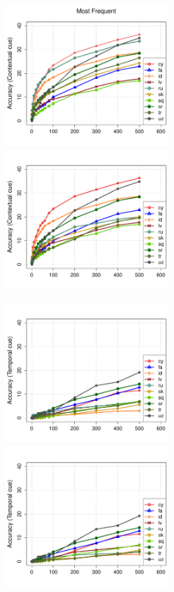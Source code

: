 \documentclass{article}
\begin{document}
\begin{figure}[h!]
\centerline{\mbox{\includegraphics[width=2.4in]{figures/exp3/freq/freqcontext} \includegraphics[width=2.4in]{figures/exp3/rand/randcontext}}}
\centerline{\mbox{\includegraphics[width=2.4in]{figures/exp3/freq/freqtime} \includegraphics[width=2.4in]{figures/exp3/rand/randtime}}}

\end{figure}
\end{document}
